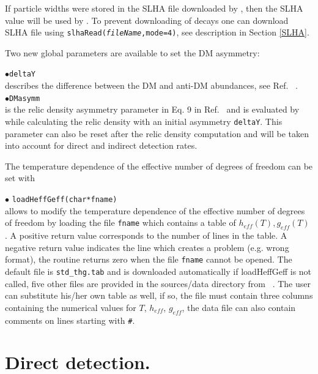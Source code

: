 \documentclass[12pt,a4paper]{article}
\begin{document}
If  particle widths  were stored in the SLHA file downloaded by \micro, then the SLHA value will be used by \micro. To prevent downloading of decays one can download SLHA file using  {\tt slhaRead({\it fileName},mode=4)}, see description in Section \ref{SLHA}. 


Two new  global parameters are available to set  the DM asymmetry:

\noindent
$\bullet$\verb|deltaY|\\
describes the difference between the DM and anti-DM abundances, see Ref.~\cite{Belanger:2013oya} .\\
\noindent
$\bullet$\verb|DMasymm|\\
is the relic density asymmetry parameter in Eq. 9 in Ref.~\cite{Belanger:2013oya} and is evaluated by \micro~ while calculating the relic density with an initial asymmetry  \verb|deltaY|. This parameter can also be reset  after the relic density computation and will be taken into account for direct and indirect detection rates.


The temperature dependence of the effective number of degrees of freedom can be set with

\noindent$\bullet$ \verb|loadHeffGeff(char*fname)|\\
allows to modify the temperature dependence of the effective number of degrees of freedom
by loading the file \verb|fname| which contains a table of $h_{eff}(T), g_{eff}(T)$ . 
A positive  return value corresponds to the number of lines in the table. A negative return value indicates the line which creates a problem (e.g. wrong format), the routine returns zero when the file \verb|fname| cannot be opened.  The default file is \verb|std_thg.tab| and is downloaded automatically if loadHeffGeff is not called, five other files are provided in the sources/data directory from ~\cite{Hindmarsh:2005ix}.
The user can substitute his/her own table as well, if so, the file must contain three columns containing the numerical values for $T$, $h_{eff}$, $g_{eff}$, the data file can also contain comments on lines starting with \verb|#|.





\section{Direct detection.}
\end{document}
